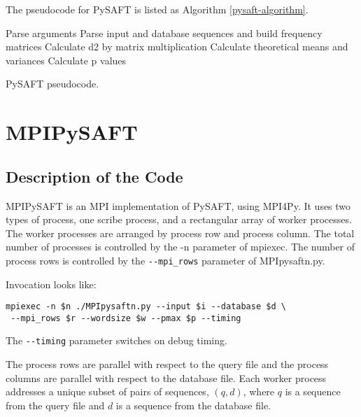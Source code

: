 \documentclass[11pt]{report}
\begin{document}
The pseudocode for PySAFT is listed as Algorithm \ref{pysaft-algorithm}.
\begin{algorithm}
Parse arguments\;
Parse input and database sequences and build frequency matrices\;
Calculate d2 by matrix multiplication\;
Calculate theoretical means and variances\;
Calculate p values\;
\caption{PySAFT pseudocode.}
\label{pysaft-algorithm}
\end{algorithm}

\chapter{MPIPySAFT}
\section{Description of the Code}

MPIPySAFT is an MPI implementation of PySAFT, using MPI4Py. It uses two types 
of process, one scribe process, and a rectangular array of worker processes.
The worker processes are arranged by process row and process column. 
The total number of processes is controlled by the -n parameter of mpiexec. 
The number of process rows is controlled by the \verb!--mpi_rows! parameter of MPIpysaftn.py.

Invocation looks like:
\begin{verbatim}
mpiexec -n $n ./MPIpysaftn.py --input $i --database $d \
 --mpi_rows $r --wordsize $w --pmax $p --timing
\end{verbatim}
The \verb!--timing! parameter switches on debug timing.

The process rows are parallel with respect to the query file and the process 
columns are parallel with respect to the database file. 
Each worker process addresses a unique subset of pairs of sequences, $(q,d)$, where $q$ is a sequence 
from the query file and $d$ is a sequence from the database file.
\end{document}
